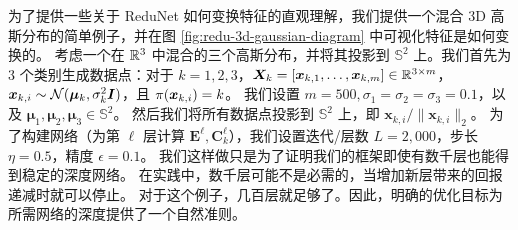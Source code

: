 \documentclass[../../book-main.tex]{subfiles}
\begin{document}
\begin{example}
为了提供一些关于 ReduNet 如何变换特征的直观理解，我们提供一个混合 3D 高斯分布的简单例子，并在图 \ref{fig:redu-3d-gaussian-diagram} 中可视化特征是如何变换的。
考虑一个在 $\mathbb{R}^{3}$ 中混合的三个高斯分布，并将其投影到 $\mathbb{S}^2$ 上。我们首先为 3 个类别生成数据点：对于 $k=1,2,3$，$\bm{X}_{k}=[\bm{x}_{k,1}, \ldots, \bm{x}_{k,m}] \in \mathbb{R}^{3\times m}$，$\bm{x}_{k,i} \sim \mathcal{N}(\bm{\mu}_{k}, \sigma_{k}^{2} \bm{I})$，且 ${\pi}(\bm{x}_{k,i}) = k$。
我们设置 $m=500, \sigma_{1}=\sigma_{2}=\sigma_{3}=0.1$，以及 $\bm{\mu}_{1}, \bm{\mu}_{2}, \bm{\mu}_{3} \in \mathbb{S}^2$。
然后我们将所有数据点投影到 $\mathbb{S}^{2}$ 上，即 $\bm{x}_{k,i}/\|\bm{x}_{k,i}\|_{2}$。
为了构建网络（为第 $\ell$ 层计算 $\bm{E}^{\ell}, \bm{C}^{\ell}_{k}$），我们设置迭代/层数 $L=2,000$，步长 $\eta=0.5$，精度 $\epsilon=0.1$。
我们这样做只是为了证明我们的框架即使有数千层也能得到稳定的深度网络。
在实践中，数千层可能不是必需的，当增加新层带来的回报递减时就可以停止。
对于这个例子，几百层就足够了。因此，明确的优化目标为所需网络的深度提供了一个自然准则。


\end{example}
\end{document}
